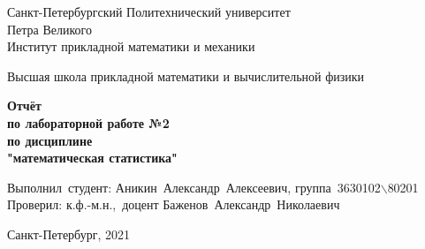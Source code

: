 \documentclass[12pt,a4paper]{article}
\begin{document}
	
	\begin{titlepage}
		
		\begin{center}
			\begin{large}
				Санкт-Петербургский Политехнический университет\\ Петра Великого\\
				Институт прикладной математики и механики\\
			\end{large}
			\vspace{0.2cm}
			Высшая школа прикладной математики и вычислительной физики\\
			
		\end{center}
		
		\vspace{3cm}
		\begin{center}
			\textbf{Отчёт\\ по лабораторной работе №2\\ по дисциплине\\ "математическая статистика"}
		\end{center}
		
		\vspace{3cm}
		
		\vbox{%
			\hfill%
			\vbox{%
				\hbox{Выполнил студент:}%
				\hbox{\break}
				\hbox{Аникин Александр Алексеевич,}%
				\hbox{группа 3630102$\backslash$80201}%
				\hbox{\break}
				\hbox{\break}
				\hbox{Проверил:}
				\hbox{\break}
				\hbox{к.ф.-м.н., доцент}
				\hbox{Баженов Александр Николаевич}
			}%
		} 
		\vfill
		
		\begin{center}
			Санкт-Петербург, 2021
		\end{center}
		
	\end{titlepage}
	\tableofcontents
	\newpage
	
	\listoftables
	\newpage
	
\end{document}
